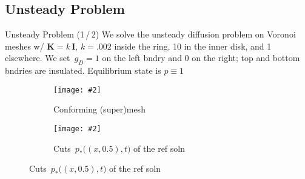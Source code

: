 \documentclass[svgnames]{beamer} %
\newcommand{\includegraphicsw}[2][1.]{\texttt{[image: \#2]}}
\newcommand{\vect}[1]{\boldsymbol{\mathbf{#1}}}
\begin{document}
	\subsection{Unsteady Problem}
	
	\begin{frame}{Unsteady Problem (1\,/\,2)}
		We solve the unsteady diffusion problem on Voronoi meshes w/ $\vect K = k\,\vect I$, $k = .002$ inside the ring, 10 in the inner disk, and 1 elsewhere. We set~$g_D = 1$ on the left bndry and 0 on the right; top and bottom bndries are insulated. Equilibrium state is $p \equiv 1$
		\begin{figure}
			\centering
			\begin{subfigure}{.4\linewidth}
				\centering
				\includegraphicsw{transient2/supermesh.png}
				\caption{Conforming (super)mesh}
			\end{subfigure}%
			\hfill
			\begin{subfigure}{.58\linewidth}
				\centering
				\includegraphicsw{transient2/ref_slices.png}
				\caption{Cuts~$p_*\big((x,0.5), t\big)$ of the ref soln}	
			\end{subfigure}
		\end{figure}
	\end{frame}

\end{document}
